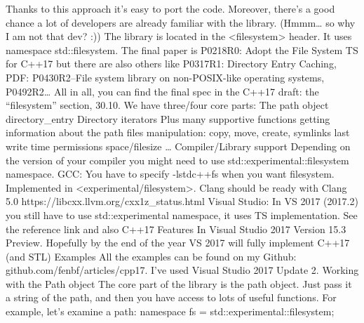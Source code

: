 Thanks to this approach it’s easy to port the code. Moreover, there’s a good chance a lot of developers are already familiar with the library. (Hmmm… so why I am not that dev? :))
The library is located in the <filesystem> header. It uses namespace std::filesystem.
The final paper is P0218R0: Adopt the File System TS for C++17 but there are also others like P0317R1: Directory Entry Caching, PDF: P0430R2–File system library on non-POSIX-like operating systems, P0492R2… All in all, you can find the final spec in the C++17 draft: the “filesystem” section, 30.10.
We have three/four core parts:
The path object
directory_entry
Directory iterators
Plus many supportive functions 
getting information about the path
files manipulation: copy, move, create, symlinks
last write time
permissions
space/filesize
…
Compiler/Library support
Depending on the version of your compiler you might need to use std::experimental::filesystem namespace.
GCC: You have to specify -lstdc++fs when you want filesystem. Implemented in <experimental/filesystem>.
Clang should be ready with Clang 5.0 
https://libcxx.llvm.org/cxx1z_status.html 
Visual Studio: In VS 2017 (2017.2) you still have to use std::experimental namespace, it uses TS implementation. 
See the reference link and also C++17 Features In Visual Studio 2017 Version 15.3 Preview.
Hopefully by the end of the year VS 2017 will fully implement C++17 (and STL)
Examples
All the examples can be found on my Github: github.com/fenbf/articles/cpp17.
I’ve used Visual Studio 2017 Update 2.
Working with the Path object
The core part of the library is the path object. Just pass it a string of the path, and then you have access to lots of useful functions.
For example, let’s examine a path:
namespace fs = std::experimental::filesystem;

